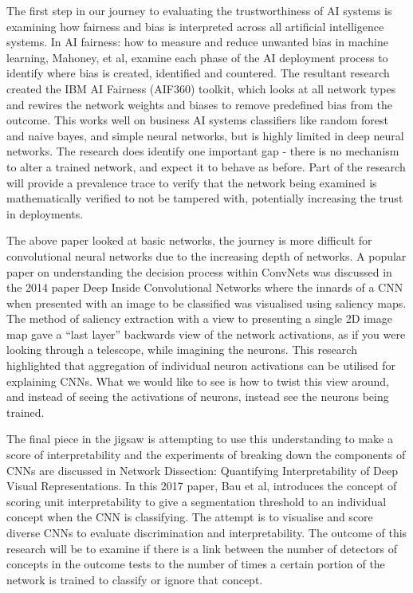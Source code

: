 The first step in our journey to evaluating the trustworthiness of AI systems is examining how fairness and bias is interpreted across all artificial intelligence systems. In AI fairness: how to measure and reduce unwanted bias in machine learning, Mahoney, et al, examine each phase of the AI deployment process to identify where bias is created, identified and countered. The resultant research created the IBM AI Fairness (AIF360) toolkit\cite{mahoneyAIFairnessHow2020}, which looks at all network types and rewires the network weights and biases to remove predefined bias from the outcome. This works well on business AI systems classifiers like random forest and naive bayes, and simple neural networks, but is highly limited in deep neural networks. The research does identify one important gap - there is no mechanism to alter a trained network, and expect it to behave as before. Part of the research will provide a prevalence trace to verify that the network being examined is mathematically verified to not be tampered with, potentially increasing the trust in deployments.

The above paper looked at basic networks, the journey is more difficult for convolutional neural networks due to the increasing depth of networks. A popular paper on understanding the decision process within ConvNets was discussed in the 2014 paper Deep Inside Convolutional Networks \cite{simonyanDeepConvolutionalNetworks2014} where the innards of a CNN when presented with an image to be classified was visualised using saliency maps. The method of saliency extraction with a view to presenting a single 2D image map gave a “last layer” backwards view of the network activations, as if you were looking through a telescope, while imagining the neurons. This research highlighted that aggregation of individual neuron activations can be utilised for explaining CNNs. What we would like to see is how to twist this view around, and instead of seeing the activations of neurons, instead see the neurons being trained.

The final piece in the jigsaw is attempting to use this understanding to make a score of interpretability and the experiments of breaking down the components of CNNs are discussed in Network Dissection: Quantifying Interpretability of Deep Visual Representations\cite{bauNetworkDissectionQuantifying2017}. In this 2017 paper, Bau et al, introduces the concept of scoring unit interpretability to give a segmentation threshold to an individual concept when the CNN is classifying. The attempt is to visualise and score diverse CNNs to evaluate discrimination and interpretability. The outcome of this research will be to examine if there is a link between the number of detectors of concepts in the outcome tests to the number of times a certain portion of the network is trained to classify or ignore that concept.


